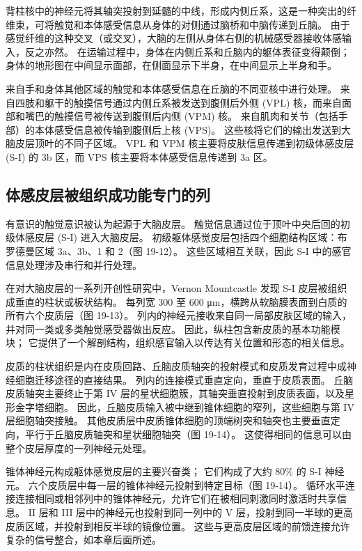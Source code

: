 背柱核中的神经元将其轴突投射到延髓的中线，形成内侧丘系，这是一种突出的纤维束，可将触觉和本体感受信息从身体的对侧通过脑桥和中脑传递到丘脑。 由于感觉纤维的这种交叉（或交叉），大脑的左侧从身体右侧的机械感受器接收体感输入，反之亦然。 在运输过程中，身体在内侧丘系和丘脑内的躯体表征变得颠倒； 身体的地形图在中间显示面部，在侧面显示下半身，在中间显示上半身和手。

来自手和身体其他区域的触觉和本体感受信息在丘脑的不同亚核中进行处理。 来自四肢和躯干的触摸信号通过内侧丘系被发送到腹侧后外侧 (VPL) 核，而来自面部和嘴巴的触摸信号被传送到腹侧后内侧 (VPM) 核。 来自肌肉和关节（包括手部）的本体感受信息被传输到腹侧后上核 (VPS)。 这些核将它们的输出发送到大脑皮层顶叶的不同子区域。 VPL 和 VPM 核主要将皮肤信息传递到初级体感皮层 (S-I) 的 3b 区，而 VPS 核主要将本体感受信息传递到 3a 区。

\subsection{体感皮层被组织成功能专门的列}
有意识的触觉意识被认为起源于大脑皮层。 触觉信息通过位于顶叶中央后回的初级体感皮层 (S-I) 进入大脑皮层。 初级躯体感觉皮层包括四个细胞结构区域：布罗德曼区域 3a、3b、1 和 2（图 19-12）。 这些区域相互关联，因此 S-I 中的感官信息处理涉及串行和并行处理。

在对大脑皮层的一系列开创性研究中，Vernon Mountcastle 发现 S-I 皮层被组织成垂直的柱状或板状结构。 每列宽 300 至 600 μm，横跨从软脑膜表面到白质的所有六个皮质层（图 19-13）。 列内的神经元接收来自同一局部皮肤区域的输入，并对同一类或多类触觉感受器做出反应。 因此，纵柱包含新皮质的基本功能模块； 它提供了一个解剖结构，组织感官输入以传达有关位置和形态的相关信息。

皮质的柱状组织是内在皮质回路、丘脑皮质轴突的投射模式和皮质发育过程中成神经细胞迁移途径的直接结果。 列内的连接模式垂直定向，垂直于皮质表面。 丘脑皮质轴突主要终止于第 IV 层的星状细胞簇，其轴突垂直投射到皮质表面，以及星形金字塔细胞。 因此，丘脑皮质输入被中继到锥体细胞的窄列，这些细胞与第 IV 层细胞轴突接触。 其他皮质层中皮质锥体细胞的顶端树突和轴突也主要垂直定向，平行于丘脑皮质轴突和星状细胞轴突（图 19-14）。 这使得相同的信息可以由整个皮层厚度的一列神经元处理。

锥体神经元构成躯体感觉皮层的主要兴奋类； 它们构成了大约 80\% 的 S-I 神经元。 六个皮质层中每一层的锥体神经元投射到特定目标（图 19-14）。 循环水平连接连接相同或相邻列中的锥体神经元，允许它们在被相同刺激同时激活时共享信息。 II 层和 III 层中的神经元也投射到同一列中的 V 层，投射到同一半球的更高皮质区域，并投射到相反半球的镜像位置。 这些与更高皮层区域的前馈连接允许复杂的信号整合，如本章后面所述。

